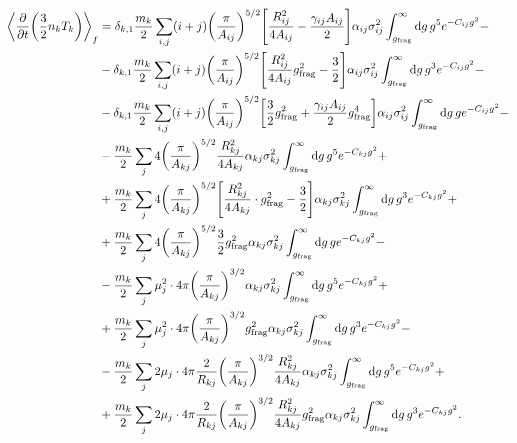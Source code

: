\documentclass[aps,prl,preprint,groupedaddress,10pt]{revtex4-2}
\begin{document}
\begin{equation}
    \begin{split}
        \avg{\pdv{t}\pqty{\frac{3}{2}n_kT_k}}_f&=\delta_{k,1}\frac{m_k}{2}
        \sum_{i,j}(i+j)\pqty{\frac{\pi}{A_{ij}}}^{5/2}
        \bqty{\frac{R_{ij}^2}{4A_{ij}}-\frac{\gamma_{ij}A_{ij}}{2}}
        \alpha_{ij}\sigma_{ij}^2\int_{\ltx{g}{frag}}^{\infty}
        \dd{g}g^5e^{-C_{ij}g^2}-\\
        &-\delta_{k,1}\frac{m_k}{2}
        \sum_{i,j}(i+j)\pqty{\frac{\pi}{A_{ij}}}^{5/2}
        \bqty{\frac{R_{ij}^2}{4A_{ij}}\ltx{g}{frag}^2-\frac{3}{2}}
        \alpha_{ij}\sigma_{ij}^2
        \int_{\ltx{g}{frag}}^{\infty}
        \dd{g}g^3e^{-C_{ij}g^2}-\\
        &-\delta_{k,1}\frac{m_k}{2}
        \sum_{i,j}(i+j)\pqty{\frac{\pi}{A_{ij}}}^{5/2}
        \bqty{\frac{3}{2}\ltx{g}{frag}^2+\frac{\gamma_{ij}A_{ij}}{2}\ltx{g}{frag}^4}
        \alpha_{ij}\sigma_{ij}^2
        \int_{\ltx{g}{frag}}^{\infty}\dd{g}ge^{-C_{ij}g^2}-\\
        &-\frac{m_k}{2}\sum_{j}4\pqty{\frac{\pi}{A_{kj}}}^{5/2}
        \frac{R_{kj}^2}{4A_{kj}}\alpha_{kj}\sigma_{kj}^2\int_{\ltx{g}{frag}}^{\infty}
        \dd{g}g^5 e^{-C_{kj}g^2}+\\
        &+\frac{m_k}{2}\sum_{j}4\pqty{\frac{\pi}{A_{kj}}}^{5/2}
        \bqty{\frac{R_{kj}^2}{4A_{kj}}\cdot\ltx{g}{frag}^2-\frac{3}{2}}
        \alpha_{kj}\sigma_{kj}^2\int_{\ltx{g}{frag}}^{\infty}
        \dd{g}g^3e^{-C_{kj}g^2}+\\
        &+\frac{m_k}{2}\sum_{j}4\pqty{\frac{\pi}{A_{kj}}}^{5/2}
        \frac{3}{2}\ltx{g}{frag}^2\alpha_{kj}
        \sigma_{kj}^2\int_{\ltx{g}{frag}}^{\infty}
        \dd{g}ge^{-C_{kj}g^2}-\\
        &-\frac{m_k}{2}\sum_{j}\mu_j^2\cdot4\pi\pqty{\frac{\pi}{A_{kj}}}^{3/2}
        \alpha_{kj}\sigma_{kj}^2
        \int_{\ltx{g}{frag}}^{\infty}\dd{g}g^5e^{-C_{kj}g^2}+\\
        &+\frac{m_k}{2}\sum_{j}\mu_j^2\cdot4\pi\pqty{\frac{\pi}{A_{kj}}}^{3/2}
        \ltx{g}{frag}^2\alpha_{kj}\sigma_{kj}^2
        \int_{\ltx{g}{frag}}^{\infty}\dd{g}g^3e^{-C_{kj}g^2}-\\
        &-\frac{m_k}{2}\sum_{j}2\mu_j\cdot4\pi\frac{2}{R_{kj}}
        \pqty{\frac{\pi}{A_{kj}}}^{3/2}\frac{R_{kj}^2}{4A_{kj}}\alpha_{kj}\sigma_{kj}^2
        \int_{\ltx{g}{frag}}^{\infty}\dd{g}g^5e^{-C_{kj}g^2}+\\
        &+\frac{m_k}{2}\sum_{j}2\mu_j\cdot4\pi\frac{2}{R_{kj}}
        \pqty{\frac{\pi}{A_{kj}}}^{3/2}\frac{R_{kj}^2}{4A_{kj}}
        \ltx{g}{frag}^2\alpha_{kj}\sigma_{kj}^2
        \int_{\ltx{g}{frag}}^{\infty}\dd{g}g^3e^{-C_{kj}g^2}.
    \end{split}
\end{equation}
\end{document}
